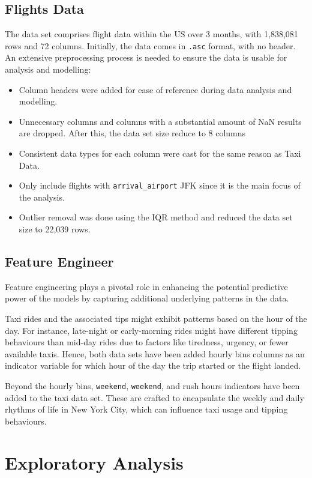 \documentclass[11pt]{article}
\begin{document}
\subsection{Flights Data}
The data set comprises flight data within the US over 3 months, with 1,838,081 rows and 72 columns. Initially, the data comes in \texttt{.asc} format, with no header. An extensive preprocessing process is needed to ensure the data is usable for analysis and modelling:
\begin{itemize}
    \item Column headers were added for ease of reference during data analysis and modelling. 
    \item Unnecessary columns and columns with a substantial amount of NaN results are dropped. After this, the data set size reduce to 8 columns
    \item Consistent data types for each column were cast for the same reason as Taxi Data. 
    \item Only include flights with \texttt{arrival\_airport} JFK since it is the main focus of the analysis. 
    \item Outlier removal was done using the IQR method and reduced the data set size to 22,039 rows.
\end{itemize}

\subsection{Feature Engineer}
Feature engineering plays a pivotal role in enhancing the potential predictive power of the models by capturing additional underlying patterns in the data.

Taxi rides and the associated tips might exhibit patterns based on the hour of the day. For instance, late-night or early-morning rides might have different tipping behaviours than mid-day rides due to factors like tiredness, urgency, or fewer available taxis. Hence, both data sets have been added hourly bins columns as an indicator variable for which hour of the day the trip started or the flight landed. 

Beyond the hourly bins, \texttt{weekend}, \texttt{weekend}, and rush hours indicators have been added to the taxi data set. These are crafted to encapsulate the weekly and daily rhythms of life in New York City, which can influence taxi usage and tipping behaviours.

\section{Exploratory Analysis}
\end{document}
